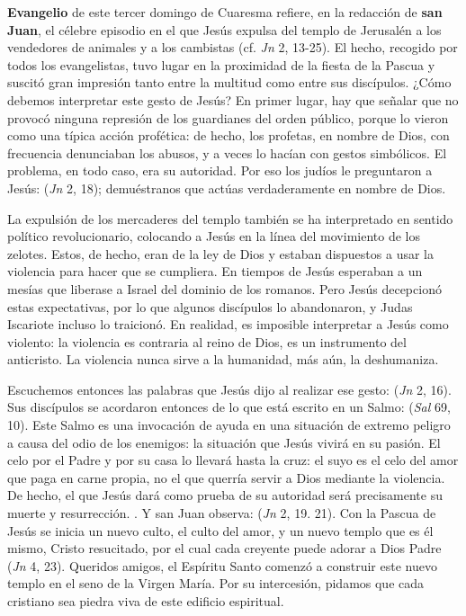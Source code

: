 \begin{body}
 \textbf{Evangelio} de este tercer domingo de Cuaresma refiere, en la redacción de \textbf{san Juan}, el célebre episodio en el que Jesús expulsa del templo de Jerusalén a los vendedores de animales y a los cambistas (cf. \textit{Jn} 2, 13-25). El hecho, recogido por todos los evangelistas, tuvo lugar en la proximidad de la fiesta de la Pascua y suscitó gran impresión tanto entre la multitud como entre sus discípulos. ¿Cómo debemos interpretar este gesto de Jesús? En primer lugar, hay que señalar que no provocó ninguna represión de los guardianes del orden público, porque lo vieron como una típica acción profética: de hecho, los profetas, en nombre de Dios, con frecuencia denunciaban los abusos, y a veces lo hacían con gestos simbólicos. El problema, en todo caso, era su autoridad. Por eso los judíos le preguntaron a Jesús:  (\textit{Jn} 2, 18); demuéstranos que actúas verdaderamente en nombre de Dios.

La expulsión de los mercaderes del templo también se ha interpretado en sentido político revolucionario, colocando a Jesús en la línea del movimiento de los zelotes. Estos, de hecho, eran  de la ley de Dios y estaban dispuestos a usar la violencia para hacer que se cumpliera. En tiempos de Jesús esperaban a un mesías que liberase a Israel del dominio de los romanos. Pero Jesús decepcionó estas expectativas, por lo que algunos discípulos lo abandonaron, y Judas Iscariote incluso lo traicionó. En realidad, es imposible interpretar a Jesús como violento: la violencia es contraria al reino de Dios, es un instrumento del anticristo. La violencia nunca sirve a la humanidad, más aún, la deshumaniza.

Escuchemos entonces las palabras que Jesús dijo al realizar ese gesto:  (\textit{Jn} 2, 16). Sus discípulos se acordaron entonces de lo que está escrito en un Salmo:  (\textit{Sal} 69, 10). Este Salmo es una invocación de ayuda en una situación de extremo peligro a causa del odio de los enemigos: la situación que Jesús vivirá en su pasión. El celo por el Padre y por su casa lo llevará hasta la cruz: el suyo es el celo del amor que paga en carne propia, no el que querría servir a Dios mediante la violencia. De hecho, el  que Jesús dará como prueba de su autoridad será precisamente su muerte y resurrección. . Y san Juan observa:  (\textit{Jn} 2, 19. 21). Con la Pascua de Jesús se inicia un nuevo culto, el culto del amor, y un nuevo templo que es él mismo, Cristo resucitado, por el cual cada creyente puede adorar a Dios Padre  (\textit{Jn} 4, 23). Queridos amigos, el Espíritu Santo comenzó a construir este nuevo templo en el seno de la Virgen María. Por su intercesión, pidamos que cada cristiano sea piedra viva de este edificio espiritual.
\end{body}

